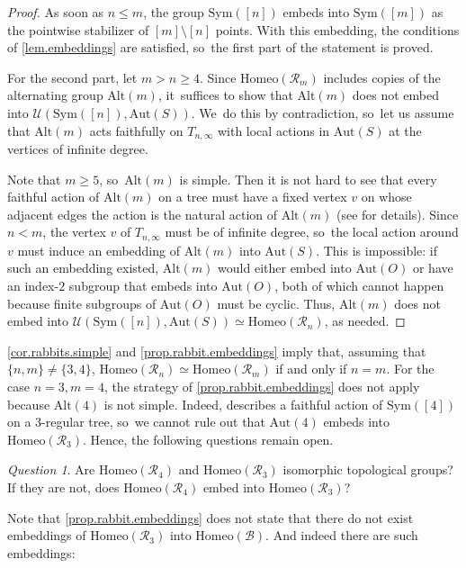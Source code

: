 \documentclass[JEP,XML,SOM,Unicode,NoFloatCountersInSection,published]{cedram}
\theoremstyle{plain}
\theoremstyle{definition}
\theoremstyle{remark}
\newtheorem{question}[theorem]{Question}
\newcommand{\Aut}{\mathrm{Aut}}
\newcommand{\Sym}{\mathrm{Sym}}
\newcommand{\Alt}{\mathrm{Alt}}
\newcommand{\Homeo}{\mathrm{Homeo}}
\newcommand{\B}{\mathcal{B}}
\newcommand{\R}{\mathcal{R}}
\newcommand{\U}{\mathcal{U}}
\begin{document}
\begin{proof}
As soon as $n \leq m$, the group $\Sym([n])$ embeds into $\Sym([m])$ as the pointwise stabilizer of $[m]\setminus[n]$ points.
With this embedding, the conditions of \cref{lem.embeddings} are satisfied, so~the first part of the statement is proved.

For the second part, let $m > n \geq 4$.
Since $\Homeo(\R_m)$ includes copies of the alternating group $\Alt(m)$, it~suffices to show that $\Alt(m)$ does not embed into $\U(\Sym([n]),\Aut(S))$. We~do this by contradiction, so~let us assume that $\Alt(m)$ acts faithfully on $T_{n,\infty}$ with local actions in $\Aut(S)$ at the vertices of infinite degree.

Note that $m \geq 5$, so~$\Alt(m)$ is simple.
Then it is not hard to see that every faithful action of $\Alt(m)$ on a tree must have a fixed vertex $v$ on whose adjacent edges the action is the natural action of $\Alt(m)$ (see \cite[Claim\,6.3]{dendriterearrangement} for details).
Since $n < m$, the vertex $v$ of $T_{n,\infty}$ must be of infinite degree, so~the local action around $v$ must induce an embedding of $\Alt(m)$ into $\Aut(S)$.
This is impossible:
if such an embedding existed, $\Alt(m)$ would either embed into $\Aut(O)$ or have an index-$2$ subgroup that embeds into $\Aut(O)$, both of which cannot happen because finite subgroups of $\Aut(O)$ must be cyclic.
Thus, $\Alt(m)$ does not embed into $\U(\Sym([n]),\Aut(S)) \simeq \Homeo(\R_n)$, as needed.
\end{proof}

\cref{cor.rabbits.simple} and \cref{prop.rabbit.embeddings} imply that, assuming that $\{n,m\} \neq \{3,4\}$, $\Homeo(\R_n) \simeq \Homeo(\R_m)$ if and only if $n=m$.
For the case $n=3, m=4$, the strategy of \cref{prop.rabbit.embeddings} does not apply because $\Alt(4)$ is not simple.
Indeed, \cite{MR586434} describes a faithful action of $\Sym([4])$ on a $3$-regular tree, so~we cannot rule out that $\Aut(4)$ embeds into $\Homeo(\R_3)$.
Hence, the following questions remain open.

\begin{question}
Are $\Homeo(\R_4)$ and $\Homeo(\R_3)$ isomorphic topological groups?
If they are not, does $\Homeo(\R_4)$ embed into $\Homeo(\R_3)$?
\end{question}

Note that \cref{prop.rabbit.embeddings} does not state that there do not exist embeddings of $\Homeo(\R_3)$ into $\Homeo(\B)$.
And indeed there are such embeddings:
\end{document}
